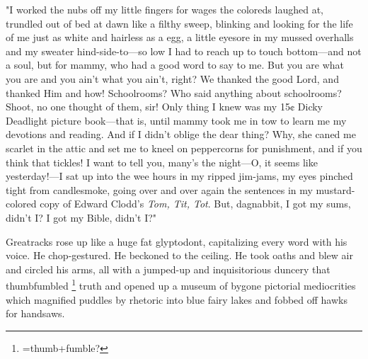   "I worked the nubs 
off my little fingers for wages the coloreds laughed at, trundled 
out of bed at dawn like a filthy sweep, blinking and looking for the
life of me just as white and hairless as a egg, a little eyesore in my mussed
overhalls and my sweater hind-side-to---so low I had to reach up to touch
bottom---and not a soul, but for mammy, who had a good word to say to me. But you
are what you are and you ain't what you ain't, right? We thanked the good Lord,
and thanked Him and how! Schoolrooms? Who said anything about schoolrooms?
Shoot, no one thought of them, sir! Only thing I knew was my 15¢ Dicky Deadlight
picture book---that is, until mammy took me in tow to learn me my devotions and
reading. And if I didn't oblige the dear thing? Why, she caned me scarlet in the
attic and set me to kneel on peppercorns for punishment, and if you think that
tickles! 
I want to tell you, many's the night---O, it seems like yesterday!---I sat
up into the wee hours in my ripped jim-jams, 
my eyes pinched tight from
candlesmoke, going over and over again the sentences in my mustard-colored copy
of Edward Clodd's \textit{Tom, Tit, Tot}. But, dagnabbit, 
I got my sums, didn't I? I got my Bible, didn't I?"
 
  Greatracks rose up like a huge fat glyptodont, 
capitalizing every word with
his voice. He chop-gestured. He beckoned to the ceiling. He took oaths and blew
air and circled his arms, all with a jumped-up and inquisitorious duncery 
that thumbfumbled 
\footnote{ =thumb+fumble? }
truth and opened up a museum of bygone pictorial mediocrities which
magnified puddles 
by rhetoric into blue fairy lakes and fobbed 
off hawks for handsaws.
 
